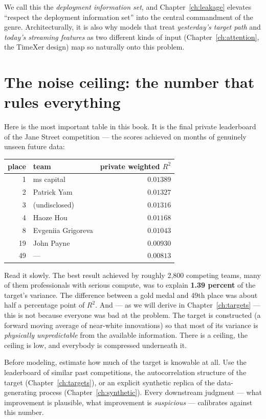 We call this the \emph{deployment information set}, and
Chapter~\ref{ch:leakage} elevates ``respect the deployment information set''
into the central commandment of the genre. Architecturally, it is also why
models that treat \emph{yesterday's target path} and \emph{today's streaming
features} as two different kinds of input (Chapter~\ref{ch:attention}, the
TimeXer design) map so naturally onto this problem.

\section{The noise ceiling: the number that rules everything}
\label{sec:noiseceiling}

Here is the most important table in this book. It is the final private
leaderboard of the Jane Street competition --- the scores achieved on months
of genuinely unseen future data:

\begin{center}
\begin{tabular}{@{}rlr@{}}
\toprule
place & team & private weighted $R^2$ \\
\midrule
1 & ms capital & $0.01389$ \\
2 & Patrick Yam & $0.01327$ \\
3 & (undisclosed) & $0.01316$ \\
4 & Haoze Hou & $0.01168$ \\
8 & Evgeniia Grigoreva & $0.01043$ \\
19 & John Payne & $0.00930$ \\
49 & --- & $0.00813$ \\
\bottomrule
\end{tabular}
\end{center}

Read it slowly. The best result achieved by roughly 2{,}800 competing teams,
many of them professionals with serious compute, was to explain
\textbf{1.39 percent} of the target's variance. The difference between a gold
medal and 49th place was about half a percentage point of $R^2$. And --- as
we will derive in Chapter~\ref{ch:targets} --- this is not because everyone
was bad at the problem. The target is constructed (a forward moving average
of near-white innovations) so that most of its variance is \emph{physically
unpredictable} from the available information. There is a ceiling, the
ceiling is low, and everybody is compressed underneath it.

\begin{keybox}
Before modeling, estimate how much of the target is knowable at all. Use the
leaderboard of similar past competitions, the autocorrelation structure of
the target (Chapter~\ref{ch:targets}), or an explicit synthetic replica of
the data-generating process (Chapter~\ref{ch:synthetic}). Every downstream
judgment --- what improvement is plausible, what improvement is
\emph{suspicious} --- calibrates against this number.
\end{keybox}

